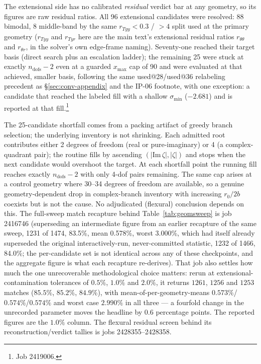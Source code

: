 \documentclass[11pt]{article}
\begin{document}
The extensional side has no calibrated \emph{residual} verdict bar at any
geometry, so its figures are raw residual ratios. All 96 extensional
candidates were resolved: 88 bimodal, 8 middle-band by the same
$r_{Tyy}<0.3$ / $>4$ split used at the primary geometry ($r_{Tyy}$ and
$r_{Tyr}$ here are the main text's extensional residual ratios
$r_{\theta\theta}$ and $r_{\theta r}$, in the solver's own edge-frame
naming).
Seventy-one reached their target basis (direct search plus an escalation
ladder); the remaining 25 were stuck at exactly $n_{\mathrm{dofs}}-2$
even at a guarded $x_{\max}$ cap of 90 and were evaluated at that
achieved, smaller basis, following the same used@28/used@36 relabeling
precedent as \S\ref{sec:conv-appendix} and the IP-06 footnote, with one
exception: a candidate that reached the labeled fill with a shallow
$\sigma_{\min}$ ($-2.681$) and is reported at that fill.\footnote{Job
2419006.}

The 25-candidate shortfall comes from a packing artifact of greedy branch selection; the underlying inventory is not shrinking. Each admitted root contributes
either 2 degrees of freedom (real or pure-imaginary) or 4 (a
complex-quadrant pair); the routine fills by ascending
$(|\mathrm{Im}\,\zeta|,|\zeta|)$ and stops when the next candidate would
overshoot the target. At each shortfall point the running fill reaches
exactly $n_{\mathrm{dofs}}-2$ with only 4-dof pairs remaining. The same
cap arises at a control geometry where 30--34 degrees of freedom are
available, so a genuine geometry-dependent drop in complex-branch
inventory with increasing $r_0/2b$ coexists but is not the cause. No
adjudicated (flexural) conclusion depends on this. The full-sweep match
recapture behind Table~\ref{tab:geomsweep} is job 2416746 (superseding an
intermediate figure from an earlier recapture of the same sweep, 1231 of
1474, 83.5\%, mean 0.578\%, worst 3.000\%, which had itself already
superseded the original interactively-run, never-committed statistic,
1232 of 1466, 84.0\%; the per-candidate set is not identical across any
of these checkpoints, and the aggregate figure is what each recapture
re-derives). That job also settles how much the one unrecoverable
methodological choice matters: rerun at extensional-contamination
tolerances of $0.5\%$, $1.0\%$ and $2.0\%$, it returns $1261$, $1256$ and
$1253$ matches ($85.5\%$, $85.2\%$, $84.9\%$), with mean-of-per-geometry-means
$0.573\%$/$0.574\%$/$0.574\%$ and worst case $2.990\%$ in all three --- a
fourfold change in the unrecorded parameter moves the headline by $0.6$
percentage points. The reported figures are the $1.0\%$ column. The flexural
residual screen behind its reconstruction/verdict tallies is jobs
2428355--2428358.
\end{document}
